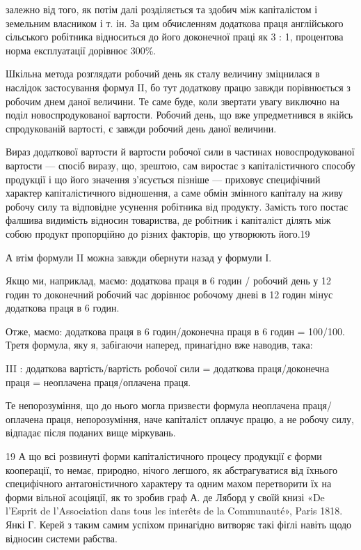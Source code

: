 залежно від того, як потім далі розділяється та здобич між капіталістом
і земельним власником і т. ін. За цим обчисленням
додаткова праця англійського сільського робітника відноситься
до його доконечної праці як 3 : 1, процентова норма експлуатації
дорівнює 300\%.

Шкільна метода розглядати робочий день як сталу величину
зміцнилася в наслідок застосування формул II, бо тут додаткову
працю завжди порівнюється з робочим днем даної величини.
Те саме буде, коли звертати увагу виключно на поділ новоспродукованої
вартости. Робочий день, що вже упредметнився в якійсь
спродукованій вартості, є завжди робочий день даної величини.

Вираз додаткової вартости й вартости робочої сили в частинах
новоспродукованої вартости — спосіб виразу, що, зрештою,
сам виростає з капіталістичного способу продукції і що його
значення з’ясується пізніше — приховує специфічний характер
капіталістичного відношення, а саме обмін змінного капіталу
на живу робочу силу та відповідне усунення робітника від продукту.
Замість того постає фалшива видимість відносин товариства,
де робітник і капіталіст ділять між собою продукт пропорційно
до різних факторів, що утворюють його.19

А втім формули II можна завжди обернути назад у формули І.

Якщо ми, наприклад, маємо: додаткова праця в 6 годин /
робочий день у 12 годин то доконечний
робочий час дорівнює робочому дневі в 12 годин мінус
додаткова праця в 6 годин.

Отже, маємо:
додаткова праця в 6 годин/доконечна праця в 6 годин = 100/100.
Третя формула, яку я, забігаючи наперед, принагідно вже
наводив, така:

III : додаткова вартість/вартість робочої сили =
додаткова праця/доконечна праця =
неоплачена праця/оплачена праця.

Те непорозуміння, що до нього могла призвести формула
неоплачена праця/оплачена праця, непорозуміння, наче капіталіст оплачує працю,
а не робочу силу, відпадає після поданих вище міркувань.

19    А що всі розвинуті форми капіталістичного процесу продукції
є форми кооперації, то немає, природно, нічого легшого, як абстрагуватися
від їхнього специфічного антагоністичного характеру та одним
махом перетворити їх на форми вільної асоціяції, як то зробив граф
А. де Ляборд у своїй книзі «De l’Esprit de l’Association dans tous les
interêts de la Communauté», Paris 1818. Янкі Г. Керей з таким самим
успіхом принагідно витворяє такі фіґлі навіть щодо відносин системи
рабства.

